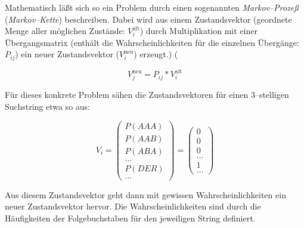 \documentclass[paper=a4,notitlepage,parskip=half,plainheadsepline]{scrartcl}
\begin{document}
Mathematisch läßt sich so ein Problem durch einen sogenannten \emph{Markov--Prozeß} (\emph{Markov--Kette}) beschreiben.
Dabei wird aus einem Zustandsvektor (geordnete Menge aller möglichen Zustände: $V_i^{\mathrm{alt}}$) durch Multiplikation mit einer Übergangsmatrix (enthält die Wahrscheinlichkeiten für die einzelnen Übergänge: $P_{ij}$) ein neuer Zustandsvektor ($V_i^{\mathrm{neu}}$) erzeugt.) (

$$V^\mathrm{neu}_j = P_{ij} * V^\mathrm{alt}_i$$

Für dieses konkrete Problem sähen die Zustandsvektoren für einen 3--stelligen Suchstring etwa so aus:


$$V_i = \left( \begin{array}{c}P(AAA)\\P(AAB)\\P(ABA)\\\dots\\P(DER)\\\dots \end{array}\right) 
      = \left(\begin{array}{c}0\\0\\0\\\dots\\1\\\dots \end{array}\right)$$ 

Aus diesem Zustandsvektor geht dann mit gewissen Wahrscheinlichkeiten ein neuer Zustandsvektor hervor. Die Wahrscheinlichkeiten sind durch die Häufigkeiten der Folgebuchstaben für den jeweiligen String definiert.
\end{document}
